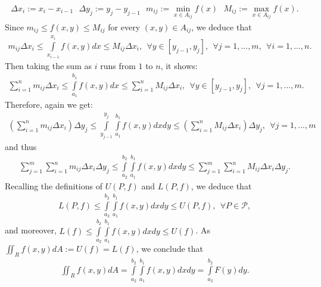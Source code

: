 \begin{problem}
\begin{solution}
\begin{enumerate}
\begin{align*}
        \Delta x_i := x_i - x_{i-1}\ \ \ \Delta y_j := y_j - y_{j-1} \ \ \ m_{ij}:= \min\limits_{x\in A_{ij}} f(x) \ \ \ M_{ij}:= \max\limits_{x\in A_{ij}} f(x).
    \end{align*}
    Since $m_{ij} \le f(x,y) \le M_{ij}$ for every $(x,y) \in A_{ij}$, we deduce that 
    \begin{align*}
        m_{ij} \Delta x_i \le \displaystyle\int\limits_{x_{i-1}}^{x_i} f(x,y) dx \le M_{ij} \Delta x_i,\ \ \forall y\in [y_{j-1},y_j],\ \ \forall j =1,...,m,\ \ \forall i=1,...,n.
    \end{align*}
    Then taking the sum as $i$ runs from $1$ to $n$, it shows:
    \begin{align*}
        \displaystyle\sum\limits_{i=1}^n m_{ij} \Delta x_i \le \displaystyle\int\limits_{a_1}^{b_1} f(x,y) dx \le  \displaystyle\sum\limits_{i=1}^n M_{ij} \Delta x_i,\ \ \forall y\in [y_{j-1}, y_j],\ \ \forall j=1,...,m. 
    \end{align*}
    Therefore, again we get:
    \begin{align*}
        \left(  \displaystyle\sum\limits_{i=1}^n m_{ij} \Delta x_i \right)\Delta y_j \le \displaystyle\int\limits_{y_{j-1}}^{y_j}\displaystyle\int\limits_{a_1}^{b_1} f(x,y) dx dy \le  \left(  \displaystyle\sum\limits_{i=1}^n M_{ij} \Delta x_i \right) \Delta y_j,\ \ \forall j=1,...,m
    \end{align*}
    and thus
    \begin{align*}
        \displaystyle\sum\limits_{j=1}^m \displaystyle\sum\limits_{i=1}^n m_{ij} \Delta x_i \Delta y_j \le \displaystyle\int\limits_{a_2}^{b_2} \displaystyle\int\limits_{a_1}^{b_1} f(x,y) dx dy \le  \displaystyle\sum\limits_{j=1}^m \displaystyle\sum\limits_{i=1}^n M_{ij} \Delta x_i \Delta y_j.
    \end{align*}
    Recalling the definitions of $U(P,f)$ and $L(P,f)$, we deduce that 
    \begin{align*}
        L(P,f) \le \displaystyle\int\limits_{a_2}^{b_2} \displaystyle\int\limits_{a_1}^{b_1} f(x,y) dx dy \le U(P,f),\ \ \forall P\in \mathcal{P},
    \end{align*}
    and moreover, $L(f) \le \int\limits_{a_2}^{b_2} \int\limits_{a_1}^{b_1} f(x,y) dx dy \le U(f)$. As $\iint_{R} f(x,y) dA := U(f) = L(f)$, we conclude that 
    \begin{align*}
        \displaystyle\iint_{R} f(x,y) dA = \displaystyle\int\limits_{a_2}^{b_2} \displaystyle\int\limits_{a_1}^{b_1} f(x,y) dx dy = \displaystyle\int\limits_{a_2}^{b_2} F(y) dy.
    \end{align*}
\end{enumerate}
\end{solution}
\end{problem}

